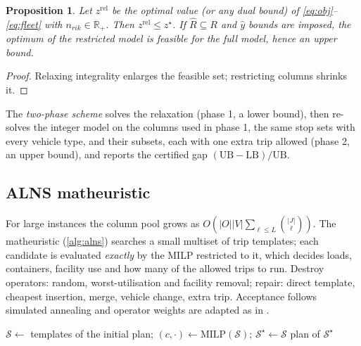 \documentclass[11pt,a4paper]{article}
\newtheorem{proposition}{Proposition}
\newcommand{\R}{\mathbb{R}}
\begin{document}
\begin{proposition}\label{prop:lb}
Let $z^{\mathrm{rel}}$ be the optimal value (or any dual bound) of \eqref{eq:obj}--\eqref{eq:fleet} with $n_{rik}\in\R_+$. Then $z^{\mathrm{rel}}\le z^\star$. If $\hat R\subseteq R$ and $\hat y$ bounds are imposed, the optimum of the restricted model is feasible for the full model, hence an upper bound.
\end{proposition}
\begin{proof}
Relaxing integrality enlarges the feasible set; restricting columns shrinks it.
\end{proof}
\noindent The \emph{two-phase scheme} solves the relaxation (phase 1, a lower bound), then re-solves the integer model on the columns used in phase 1, the same stop sets with every vehicle type, and their subsets, each with one extra trip allowed (phase 2, an upper bound), and reports the certified gap $(\mathrm{UB}-\mathrm{LB})/\mathrm{UB}$.

\subsection{ALNS matheuristic}
For large instances the column pool grows as $O(|O||V|\sum_{\ell\le L}\binom{|J|}{\ell})$. The matheuristic (\cref{alg:alns}) searches a small multiset of trip templates; each candidate is evaluated \emph{exactly} by the MILP restricted to it, which decides loads, containers, facility use and how many of the allowed trips to run. Destroy operators: random, worst-utilisation and facility removal; repair: direct template, cheapest insertion, merge, vehicle change, extra trip. Acceptance follows simulated annealing and operator weights are adapted as in \citet{ropke2006}.

\begin{algorithm}[t]
\caption{ALNS over route skeletons with exact MILP evaluation}\label{alg:alns}
$\mathcal S\gets$ templates of the initial plan; $(c,\cdot)\gets\mathrm{MILP}(\mathcal S)$; $\mathcal S^\star\gets\mathcal S$\;
\Return plan of $\mathcal S^\star$
\end{algorithm}
\end{document}
